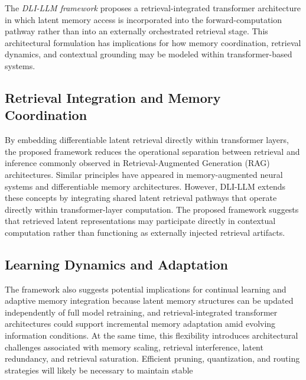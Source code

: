 \label{comparative-architectural-behavior-analysis}
The \emph{DLI-LLM framework} proposes a retrieval-integrated transformer architecture in which latent memory access is incorporated into the forward-computation pathway rather than into an externally orchestrated retrieval stage. This architectural formulation has implications for how memory coordination, retrieval dynamics, and contextual grounding may be modeled within transformer-based systems.
\hypertarget{retrieval-integration-and-memory-coordination}{%
\subsection{Retrieval Integration and Memory Coordination}}
\label{retrieval-integration-and-memory-coordination}
By embedding differentiable latent retrieval directly within transformer layers, the proposed framework reduces the operational separation between retrieval and inference commonly observed in Retrieval-Augmented Generation (RAG) architectures. Similar principles have appeared in memory-augmented neural systems and differentiable memory architectures. However, DLI-LLM extends these concepts by integrating shared latent retrieval pathways that operate directly within transformer-layer computation.
The proposed framework suggests that retrieved latent representations may participate directly in contextual computation rather than functioning as externally injected retrieval artifacts.
\hypertarget{learning-dynamics-and-adaptation}{%
\subsection{Learning Dynamics and Adaptation}}
\label{learning-dynamics-and-adaptation}
The framework also suggests potential implications for continual learning and adaptive memory integration \cite{irwin2026mlf}because latent memory structures can be updated independently of full model retraining, and retrieval-integrated transformer architectures could support incremental memory adaptation amid evolving information conditions.
At the same time, this flexibility introduces architectural challenges associated with memory scaling, retrieval interference, latent redundancy, and retrieval saturation. Efficient pruning, quantization, and routing strategies will likely be necessary to maintain stable
